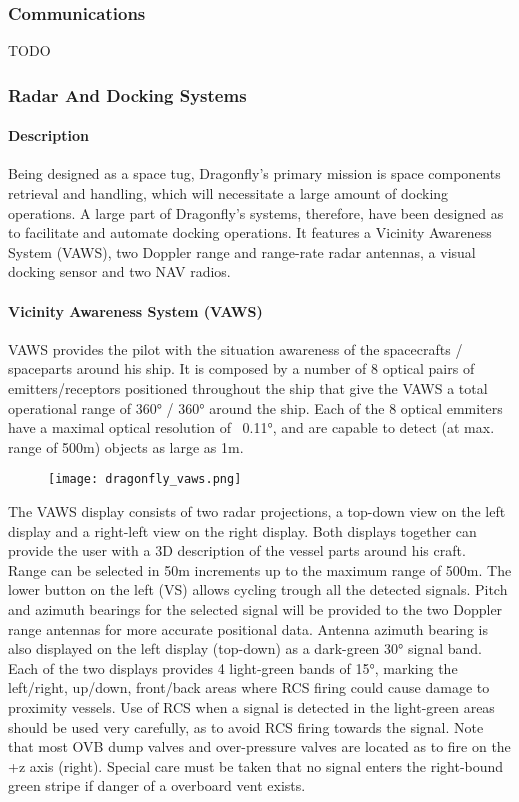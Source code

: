 \documentclass[Orbiter User Manual.tex]{subfiles}
\begin{document}
\subsubsection{Communications}
TODO

\subsubsection{Radar And Docking Systems}
\paragraph{Description}
Being designed as a space tug, Dragonfly's primary mission is space components retrieval and handling, which will necessitate a large amount of docking operations. A large part of Dragonfly's systems, therefore, have been designed as to facilitate and automate docking operations. It features a Vicinity Awareness System (VAWS), two Doppler range and range-rate radar antennas, a visual docking sensor and two NAV radios.


\paragraph{Vicinity Awareness System (VAWS)}
VAWS provides the pilot with the situation awareness of the spacecrafts / spaceparts around his ship. It is composed by a number of 8 optical pairs of emitters/receptors positioned throughout the ship that give the VAWS a total operational range of 360° / 360° around the ship. Each of the 8 optical emmiters have a maximal optical resolution of ~0.11°, and are capable to detect (at max. range of 500m) objects as large as 1m.

\begin{figure}[H]
  \centering
  \texttt{[image: dragonfly\_vaws.png]}
\end{figure}

\noindent
The VAWS display consists of two radar projections, a top-down view on the left display and a right-left view on the right display. Both displays together can provide the user with a 3D description of the vessel parts around his craft.\\
Range can be selected in 50m increments up to the maximum range of 500m. The lower button on the left (VS) allows cycling trough all the detected signals. Pitch and azimuth bearings for the selected signal will be provided to the two Doppler range antennas for more accurate positional data. Antenna azimuth bearing is also displayed on the left display (top-down) as a dark-green 30° signal band.\\
Each of the two displays provides 4 light-green bands of 15°, marking the left/right, up/down, front/back areas where RCS firing could cause damage to proximity vessels. Use of RCS when a signal is detected in the light-green areas should be used very carefully, as to avoid RCS firing towards the signal. Note that most OVB dump valves and over-pressure valves are located as to fire on the +z axis (right). Special care must be taken that no signal enters the right-bound green stripe if danger of a overboard vent exists.
\end{document}
